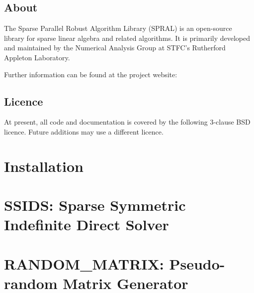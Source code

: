 \documentclass{spralweb}
\begin{document}
\tableofcontents

\let\oldthesection\thesection
\renewcommand{\thesection}{}
\section{About}
The Sparse Parallel Robust Algorithm Library (SPRAL) is an open-source library
for sparse linear algebra and related algorithms. It is primarily developed and
maintained by the Numerical Analysis Group at STFC's Rutherford Appleton Laboratory.

\noindent
Further information can be found at the project website:

\section{Licence}
At present, all code and documentation is covered by the following 3-clause BSD
licence. Future additions may use a different licence.



\renewcommand{\thesection}{\oldthesection}

\chapter{Installation}

\chapter{SSIDS: Sparse Symmetric Indefinite Direct Solver}

\chapter{RANDOM\_MATRIX: Pseudo-random Matrix Generator}

\end{document}
